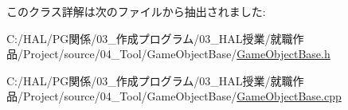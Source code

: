 このクラス詳解は次のファイルから抽出されました\+:\begin{DoxyCompactItemize}
\item 
C\+:/\+H\+A\+L/\+P\+G関係/03\+\_\+作成プログラム/03\+\_\+\+H\+A\+L授業/就職作品/\+Project/source/04\+\_\+\+Tool/\+Game\+Object\+Base/\mbox{\hyperlink{_game_object_base_8h}{Game\+Object\+Base.\+h}}\item 
C\+:/\+H\+A\+L/\+P\+G関係/03\+\_\+作成プログラム/03\+\_\+\+H\+A\+L授業/就職作品/\+Project/source/04\+\_\+\+Tool/\+Game\+Object\+Base/\mbox{\hyperlink{_game_object_base_8cpp}{Game\+Object\+Base.\+cpp}}\end{DoxyCompactItemize}
